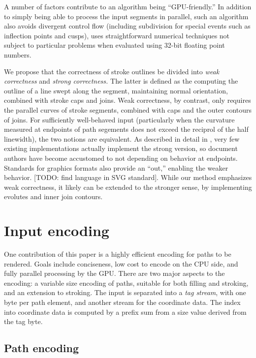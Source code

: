 \documentclass[format=acmsmall]{acmart}
\begin{document}
A number of factors contribute to an algorithm being ``GPU-friendly.'' In addition to simply being able to process the input segments in parallel, such an algorithm also avoids divergent control flow (including subdivision for special events such as inflection points and cusps), uses straightforward numerical techniques not subject to particular problems when evaluated using 32-bit floating point numbers.

We propose that the correctness of stroke outlines be divided into \emph{weak correctness} and \emph{strong correctness.} The latter is defined as the computing the outline of a line swept along the segment, maintaining normal orientation, combined with stroke caps and joins. Weak correctness, by contrast, only requires the parallel curves of stroke segments, combined with caps and the outer contours of joins. For sufficiently well-behaved input (particularly when the curvature measured at endpoints of path segements does not exceed the reciprol of the half linewidth), the two notions are equivalent. As described in detail in \cite{Nehab2020}, very few existing implementations actually implement the strong version, so document authors have become accustomed to not depending on behavior at endpoints. Standards for graphics formats also provide an ``out,'' enabling the weaker behavior. [TODO: find language in SVG standard]. While our method emphasizes weak correctness, it likely can be extended to the stronger sense, by implementing evolutes and inner join contours.

\section{Input encoding}

One contribution of this paper is a highly efficient encoding for paths to be rendered. Goals include conciseness, low cost to encode on the CPU side, and fully parallel processing by the GPU. There are two major aspects to the encoding: a variable size encoding of paths, suitable for both filling and stroking, and an extension to stroking. The input is separated into a \emph{tag stream}, with one byte per path element, and another stream for the coordinate data. The index into coordinate data is computed by a prefix sum from a size value derived from the tag byte.

\subsection{Path encoding}
\end{document}
